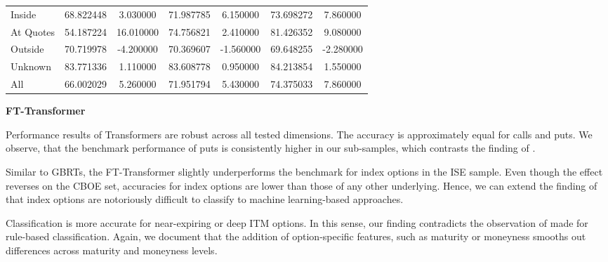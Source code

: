 \begin{table}[h!]
\begin{tabular}{lSSSSSS@{}}
        \tabindent Inside          & 68.822448                                        & 3.030000                                              & 71.987785                                     & 6.150000  & 73.698272    & 7.860000  \\
        \tabindent At Quotes       & 54.187224                                        & 16.010000                                             & 74.756821                                     & 2.410000  & 81.426352    & 9.080000  \\
        \tabindent Outside         & 70.719978                                        & -4.200000                                             & 70.369607                                     & -1.560000 & 69.648255    & -2.280000 \\
        \tabindent Unknown         & 83.771336                                        & 1.110000                                              & 83.608778                                     & 0.950000  & 84.213854    & 1.550000  \\
        \cmidrule(rl){1-7}
All             & 66.002029                                        & 5.260000                                              & 71.951794                                     & 5.430000  & 74.375033    & 7.860000  \\
        \bottomrule
    \end{tabular}
\end{table}

\clearpage

\textbf{FT-Transformer}

Performance results of Transformers are robust across all tested dimensions. The accuracy is approximately equal for calls and puts. We observe, that the benchmark performance of puts is consistently higher in our sub-samples, which contrasts the finding of \textcite[][22]{grauerOptionTradeClassification2022}.

Similar to \glspl{GBRT}, the FT-Transformer slightly underperforms the benchmark for index options in the \gls{ISE} sample. Even though the effect reverses on the \gls{CBOE} set, accuracies for index options are lower than those of any other underlying. Hence, we can extend the finding of \textcites[][22]{grauerOptionTradeClassification2022}[][886]{savickasInferringDirectionOption2003} that index options are notoriously difficult to classify to machine learning-based approaches.

Classification is more accurate for near-expiring or deep \gls{ITM} options. In this sense, our finding contradicts the observation of \textcite[][891]{savickasInferringDirectionOption2003} made for rule-based classification. Again, we document that the addition of option-specific features, such as maturity or moneyness smooths out differences across maturity and moneyness levels.

